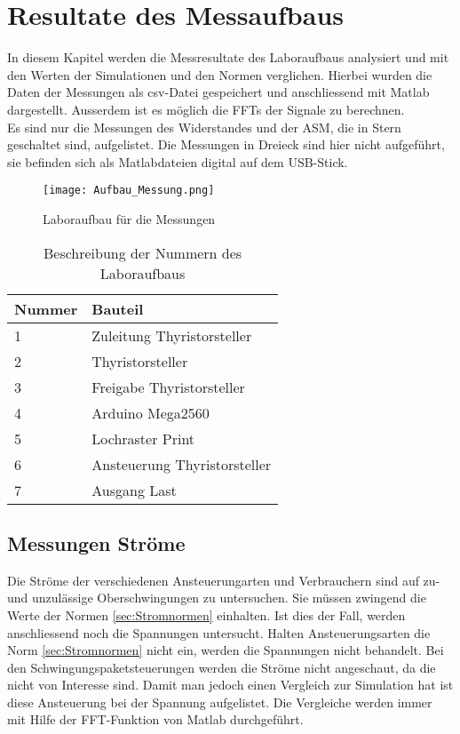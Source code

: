 \section{Resultate des Messaufbaus}
In diesem Kapitel werden die Messresultate des Laboraufbaus analysiert und mit den Werten der Simulationen und den Normen verglichen. Hierbei wurden die Daten der Messungen als csv-Datei gespeichert und anschliessend mit Matlab dargestellt. Ausserdem ist es möglich die FFTs der Signale zu berechnen.\\
Es sind nur die Messungen des Widerstandes und der ASM, die in Stern geschaltet sind, aufgelistet. Die Messungen in Dreieck sind hier nicht aufgeführt, sie befinden sich als Matlabdateien digital auf dem USB-Stick. 

\begin{figure}[ht!]
	\centering
	\texttt{[image: Aufbau\_Messung.png]}	
	\caption{Laboraufbau für die Messungen}\label{fig:Aufbau Messung}
\end{figure}


\begin{table}[ht!]
	\centering
	\begin{tabular}{|l|l|}
		\hline
		Nummer & Bauteil                                       \\ \hline
		1      & Zuleitung Thyristorsteller                \\ \hline
		2      & Thyristorsteller                              \\ \hline
		3      & Freigabe Thyristorsteller                     \\ \hline
		4      & Arduino Mega2560                              \\ \hline
		5      & Lochraster Print							   \\ \hline
		6      & Ansteuerung Thyristorsteller                  \\ \hline
		7      & Ausgang Last                      \\ \hline
	\end{tabular}
	\caption{Beschreibung der Nummern des Laboraufbaus}\label{tab:Nummern_Laboraufbau}
\end{table}





\newpage
\subsection{Messungen Ströme}
Die Ströme der verschiedenen Ansteuerungarten und Verbrauchern sind auf zu- und unzulässige Oberschwingungen zu untersuchen. Sie müssen zwingend die Werte der Normen \ref{sec:Stromnormen} einhalten. Ist dies der Fall, werden anschliessend noch die Spannungen untersucht. Halten Ansteuerungsarten die Norm \ref{sec:Stromnormen} nicht ein, werden die Spannungen nicht behandelt. Bei den Schwingungspaketsteuerungen werden die Ströme nicht angeschaut, da die nicht von Interesse sind. Damit man jedoch einen Vergleich zur Simulation hat ist diese Ansteuerung bei der Spannung aufgelistet. Die Vergleiche werden immer mit Hilfe der FFT-Funktion von Matlab durchgeführt. 

